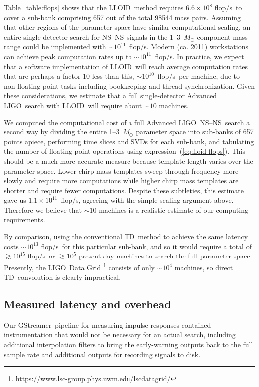 \documentclass[preprint2]{aastex}
\newcommand{\NS}{NS}
\newcommand{\LIGO}{LIGO}%
\newcommand{\flops}{flop/s}
\newcommand{\gstreamer}{GStreamer}
\newcommand{\lloid}{LLOID}%
\newcommand{\TD}{TD}%
\begin{document}
Table~\ref{table:flops} shows that the \lloid\ method requires $6.6 \times 10^8$
\flops\ to cover a sub-bank comprising 657 out of the total 98544 mass pairs.
Assuming that other regions of the parameter space have similar computational
scaling, an entire single detector search for \NS--\NS\ signals in the
1--3~$M_\odot$ component mass range could be implemented with
$\sim$$10^{11}$~\flops.  Modern (ca. 2011) workstations can achieve peak
computation rates up to $\sim$$10^{11}$~\flops.  In practice, we expect that a
software implementation of \lloid\ will reach average computation rates that are
perhaps a factor 10 less than this, $\sim$$10^{10}$~\flops\ per machine, due to
non-floating point tasks including bookkeeping and thread synchronization.
Given these considerations, we estimate that a full single-detector Advanced
\LIGO\ search with \lloid\ will require about $\sim$$10$ machines.

We computed the computational cost of a full Advanced \LIGO\ \NS--\NS\ search a
second way by dividing the entire 1--3~$M_\odot$ parameter space into sub-banks
of 657 points apiece, performing time slices and SVDs for each sub-bank, and
tabulating the number of floating point operations using
expression~(\ref{eq:lloid-flops}).  This should be a much more accurate measure
because template length varies over the parameter space.  Lower chirp mass
templates sweep through frequency more slowly and require more computations
while higher chirp mass templates are shorter and require fewer computations.
Despite these subtleties, this estimate gave us $1.1 \times 10^{11}$~\flops,
agreeing with the simple scaling argument above.  Therefore we believe that
$\sim$$10$ machines is a realistic estimate of our computing requirements.

By comparison, using the conventional \TD\ method to achieve the same latency costs
$\sim$$10^{13}$ \flops\ for this particular sub-bank, and so it would require
a total of $\gtrsim$$10^{15}$ \flops\ or $\gtrsim$$10^5$ present-day machines
to search the full parameter space.  Presently, the \LIGO\ Data Grid%
\footnote{\url{https://www.lsc-group.phys.uwm.edu/lscdatagrid/}} consists of
only $\sim$$10^4$ machines, so direct \TD\ convolution is clearly impractical.

\subsection{Measured latency and overhead}

Our \gstreamer\ pipeline for measuring impulse responses contained
instrumentation that would not be necessary for an actual search, including
additional interpolation filters to bring the early-warning outputs back to the
full sample rate and additional outputs for recording signals to disk.
\end{document}
